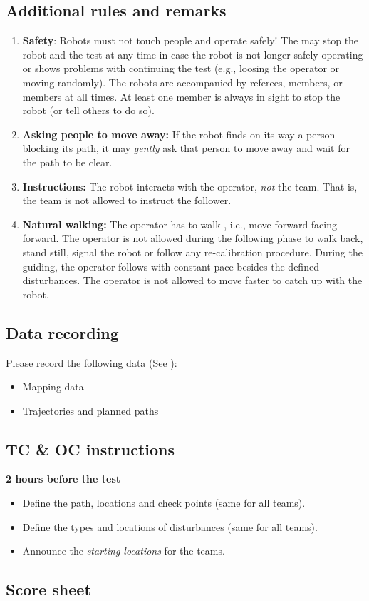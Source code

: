 \subsection{Additional rules and remarks}
\begin{enumerate}
\item \textbf{Safety}: Robots must not touch people and operate safely! 
  The \TC may stop the robot and the test at any time in case the robot is not longer safely operating or shows problems with continuing the test (e.g., loosing the operator or moving randomly).
  The robots are accompanied by referees, \OC members, or \TC members at all times.
  At least one \TC member is always in sight to stop the robot (or tell others to do so).
\item \textbf{Asking people to move away:} If the robot finds on its way a person blocking its path, it may \textit{gently} ask that person to move away and wait for the path to be clear. 
\item \textbf{Instructions:} The robot interacts with the operator, \emph{not} the team. 
That is, the team is not allowed to instruct the follower.
\item \textbf{Natural walking:} The operator has to walk , i.e., move forward facing forward. 
  The operator is not allowed during the following phase to walk back, stand still, signal the robot or follow any re-calibration procedure.
  During the guiding, the operator follows with constant pace besides the defined disturbances. 
  The operator is not allowed to move faster to catch up with the robot. 
\end{enumerate}

\subsection{Data recording}
Please record the following data (See ):
\begin{itemize}
\item Mapping data
\item Trajectories and planned paths
\end{itemize}


\subsection{TC \& OC instructions}

\textbf{2 hours before the test}
\begin{itemize}
\item Define the path, locations and check points (same for all teams).
\item Define the types and locations of disturbances (same for all teams).
\item Announce the \emph{starting locations} for the teams.
\end{itemize}

\newpage

\subsection{Score sheet}


